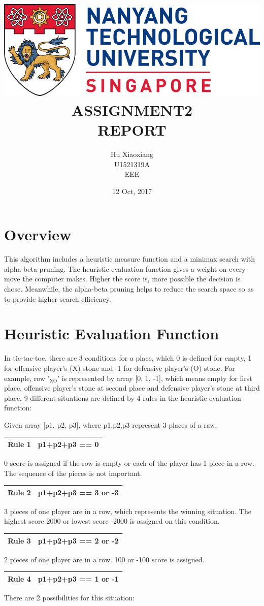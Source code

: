 \documentclass[a4paper]{scrartcl}
\author{Hu Xiaoxiang \\
U1521319A \\
EEE \\
}
\date{12 Oct, 2017 \\
}
\title{\includegraphics[width=\textwidth]{logo_ntu_new.png} \\
[3\baselineskip] ASSIGNMENT2 \\
REPORT \\
[7\baselineskip]}
\begin{document}
\maketitle
\tableofcontents

\newpage
\section{Overview}
\label{sec:org5cb4fd9}
This algorithm includes a heuristic measure function and a minimax search with
alpha-beta pruning. The heuristic evaluation function gives a weight on every
move the computer makes. Higher the score is, more possible the decision is
chose. Meanwhile, the alpha-beta pruning helps to reduce the search space so
as to provide higher search efficiency.

\section{Heuristic Evaluation Function}
\label{sec:org6f28281}
In tic-tac-toe, there are 3 conditions for a place, which 0 is defined for
empty, 1 for offensive player's (X) stone and -1 for defensive player's (O)
stone. For example, row '\(_{\text{XO}}\)' is represented by array [0, 1, -1], which means
empty for first place, offensive player's stone at second place and defensive
player's stone at third place. 9 different situations are defined by 4 rules
in the heuristic evaluation function:

Given array [p1, p2, p3], where p1,p2,p3 represent 3 places of a raw. 
\begin{center}
\begin{tabular}{ll}
\hline
Rule 1 & p1+p2+p3 == 0\\
\hline
\end{tabular}
\end{center}
0 score is assigned if the row is empty or each of the player has 1 piece in a
row. The sequence of the pieces is not important.
\begin{center}
\begin{tabular}{ll}
\hline
Rule 2 & p1+p2+p3 == 3 or -3\\
\hline
\end{tabular}
\end{center}
3 pieces of one player are in a row, which represents the winning situation.
The highest score 2000 or lowest score -2000 is assigned on this condition.
\begin{center}
\begin{tabular}{ll}
\hline
Rule 3 & p1+p2+p3 == 2 or -2\\
\hline
\end{tabular}
\end{center}
2 pieces of one player are in a row. 100 or -100 score is assigned. 
\begin{center}
\begin{tabular}{ll}
\hline
Rule 4 & p1+p2+p3 == 1 or -1\\
\hline
\end{tabular}
\end{center}
There are 2 possibilities for this situation: 
\end{document}
